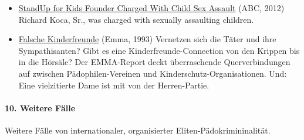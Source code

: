 \begin{itemize}
\item
  \href{https://abcnews.go.com/US/standup-kids-founder-arrested-child-sex-assault/story?id=17263199}{StandUp
  for Kids Founder Charged With Child Sex Assault} (ABC, 2012) Richard
  Koca, Sr., was charged with sexually assaulting children.
\item
  \href{https://www.emma.de/artikel/falsche-kinderfreunde-263497}{Falsche
  Kinderfreunde} (Emma, 1993) Vernetzen sich die Täter und ihre
  Sympathisanten? Gibt es eine Kinderfreunde-Connection von den Krippen
  bis in die Hörsäle? Der EMMA-Report deckt überraschende
  Querverbindungen auf zwischen Pädophilen-Vereinen und
  Kinderschutz-Organisationen. Und: Eine vielzitierte Dame ist mit von
  der Herren-Partie.
\end{itemize}

\hypertarget{10-weitere-fuxe4lle}{%
\paragraph{10. Weitere Fälle}\label{10-weitere-fuxe4lle}}

Weitere Fälle von internationaler, organisierter
Eliten-Pädokrimininalität.


